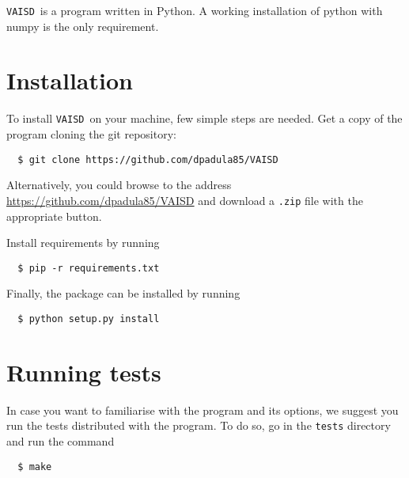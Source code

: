 \documentclass[a4paper]{article}
\newcommand{\vaisd}{\texttt{VAISD}}
\begin{document}
\vaisd\ is a program written in Python. A working installation of python with numpy is the only requirement.

\section{Installation}

To install \vaisd\ on your machine, few simple steps are needed.
Get a copy of the program cloning the git repository:

\begin{verbatim}
  $ git clone https://github.com/dpadula85/VAISD
\end{verbatim}

Alternatively, you could browse to the address \url{https://github.com/dpadula85/VAISD} and download a \verb|.zip| file with the appropriate button.

% 

Install requirements by running
\begin{verbatim}
  $ pip -r requirements.txt
\end{verbatim}

Finally, the package can be installed by running
\begin{verbatim}
  $ python setup.py install
\end{verbatim}

\section{Running tests}

In case you want to familiarise with the program and its options, we suggest you run the tests distributed with the program.
To do so, go in the \verb|tests| directory and run the command

\begin{verbatim}
  $ make
\end{verbatim}
\end{document}
